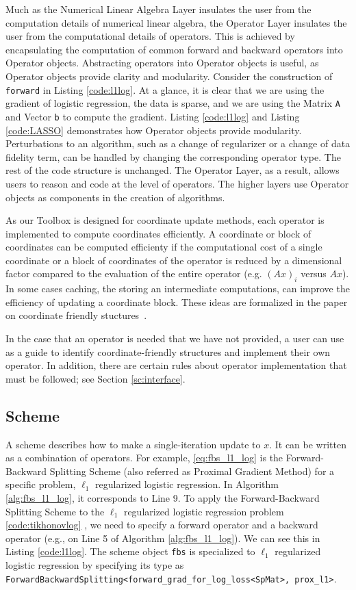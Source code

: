 Much as the Numerical Linear Algebra Layer insulates the user from the computation details of numerical linear algebra, the Operator Layer insulates the user from the computational details of operators. This is achieved by encapsulating the computation of common forward and backward operators into Operator objects. Abstracting operators into Operator objects is useful, as Operator objects provide clarity and modularity. Consider the construction of  \texttt{forward} in Listing \ref{code:l1log}. At a glance, it is clear that we are using the gradient of logistic regression, the data is sparse, and we are using the Matrix \texttt{A} and Vector \texttt{b} to compute the gradient. Listing \ref{code:l1log} and Listing \ref{code:LASSO} demonstrates how Operator objects provide modularity. Perturbations to an algorithm, such as a change of regularizer or a change of data fidelity term, can be handled by changing the corresponding operator type. The rest of the code structure is unchanged. The Operator Layer, as a result, allows users to reason and code at the level of operators. 
The higher layers use Operator objects as components in the creation of algorithms.
 
As our Toolbox is designed for coordinate update methods, each operator is implemented to compute coordinates efficiently.
 A coordinate or block of coordinates can be computed efficienty if the computational cost of a single coordinate or a block of coordinates of the operator is reduced by a dimensional factor compared to the evaluation of the entire operator (e.g. $(Ax)_i$ versus $Ax$). 
 In some cases caching, the storing an intermediate computations, can improve the efficiency of updating a coordinate block. These ideas are formalized in the paper on coordinate friendly stuctures~\citep{PengWuXuYanYin2016_coordinate}.

In the case that an operator is needed that we have not provided, a user can use~\citep{PengWuXuYanYin2016_coordinate} as a guide to identify coordinate-friendly structures and implement their own operator. In addition, there are certain rules about operator implementation that must be followed; see Section \ref{sc:interface}.


\subsection{Scheme}
A scheme describes how to make a single-iteration update to $x$.
It can be written as a combination of operators. For example, \eqref{eq:fbs_l1_log} is the Forward-Backward Splitting Scheme (also referred as Proximal Gradient Method) for a specific problem, $\ell_1$ regularized logistic regression. In Algorithm \ref{alg:fbs_l1_log}, it corresponds to Line 9. To apply the Forward-Backward Splitting Scheme to the $\ell_1$ regularized logistic regression problem \ref{code:tikhonovlog} , we need to specify a forward operator and a backward operator (e.g., on Line 5 of Algorithm \ref{alg:fbs_l1_log}). We can see this in Listing \ref{code:l1log}.
The scheme object \texttt{fbs} is specialized to $\ell_1$ regularized logistic regression by specifying its type as \texttt{ForwardBackwardSplitting<forward\_grad\_for\_log\_loss<SpMat>, prox\_l1>}.

